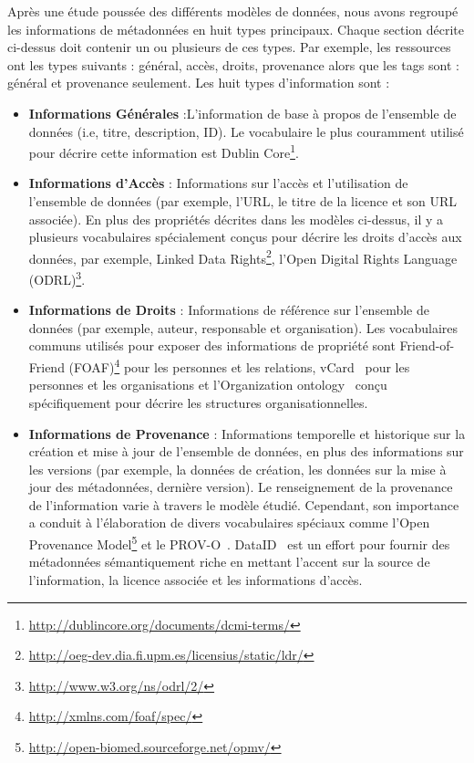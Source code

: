 Apr\`{e}s une \'{e}tude pouss\'{e}e des diff\'{e}rents mod\`{e}les de donn\'{e}es, nous avons regroup\'{e} les informations de m\'{e}tadonn\'{e}es en huit types principaux. Chaque section d\'{e}crite ci-dessus doit contenir un ou plusieurs de ces types. Par exemple, les ressources ont les types suivants : g\'{e}n\'{e}ral, acc\`{e}s, droits, provenance alors que les tags sont : g\'{e}n\'{e}ral et provenance seulement. Les huit types d'information sont :
\begin{itemize}
	\item \textbf{Informations G\'{e}n\'{e}rales} :L'information de base \`{a} propos de l'ensemble de donn\'{e}es (i.e, titre, description, ID). Le vocabulaire le plus couramment utilis\'{e} pour d\'{e}crire cette information est Dublin Core\footnote{\url{http://dublincore.org/documents/dcmi-terms/}}.
	\item \textbf{Informations d'Acc\`{e}s} : Informations sur l'acc\`{e}s et l'utilisation de l'ensemble de donn\'{e}es (par exemple, l'URL, le titre de la licence et son URL associ\'{e}e). En plus des propri\'{e}t\'{e}s d\'{e}crites dans les mod\`{e}les ci-dessus, il y a plusieurs vocabulaires sp\'{e}cialement conçus pour d\'{e}crire les droits d'acc\`{e}s aux donn\'{e}es, par exemple, Linked Data Rights\footnote{\url{http://oeg-dev.dia.fi.upm.es/licensius/static/ldr/}}, l'Open Digital Rights Language (ODRL)\footnote{\url{http://www.w3.org/ns/odrl/2/}}.
	\item \textbf{Informations de Droits} : Informations de r\'{e}f\'{e}rence sur l'ensemble de donn\'{e}es (par exemple, auteur, responsable et organisation). Les vocabulaires communs utilis\'{e}s pour exposer des informations de propri\'{e}t\'{e} sont Friend-of-Friend (FOAF)\footnote{\url{http://xmlns.com/foaf/spec/}} pour les personnes et les relations, vCard~\cite{Iannella:W3C:14} pour les personnes et les organisations et l'Organization ontology~\cite{Reynolds:W3C:14} conçu sp\'{e}cifiquement pour d\'{e}crire les structures organisationnelles.
	\item \textbf{Informations de Provenance} : Informations temporelle et historique sur la cr\'{e}ation et mise \`{a} jour de l'ensemble de donn\'{e}es, en plus des informations sur les versions (par exemple, la donn\'{e}es de cr\'{e}ation, les donn\'{e}es sur la mise \`{a} jour des m\'{e}tadonn\'{e}es, derni\`{e}re version). Le renseignement de la provenance de l'information varie \`{a} travers le mod\`{e}le \'{e}tudi\'{e}. Cependant, son importance a conduit \`{a} l'\'{e}laboration de divers vocabulaires sp\'{e}ciaux comme l'Open Provenance Model\footnote{\url{http://open-biomed.sourceforge.net/opmv/}} et le PROV-O~\cite{Lebo:W3C:13}. DataID~\cite{Brummer::ICSS:14} est un effort pour fournir des m\'{e}tadonn\'{e}es s\'{e}mantiquement riche en mettant l'accent sur la source de l'information, la licence associ\'{e}e et les informations d'acc\`{e}s.

\end{itemize}
